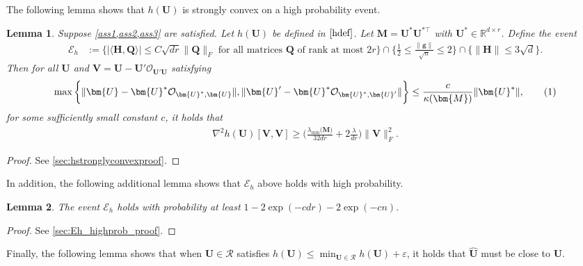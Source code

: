 \documentclass[10pt]{article}
\newcommand\numberthis{\addtocounter{equation}{1}\tag{\theequation}}
\newcommand{\eps}{\ensuremath{\varepsilon}}
\newcommand{\s}{^*}
\renewcommand{\hat}{\widehat}
\newtheorem{lemma}{Lemma}
\theoremstyle{definition}
\begin{document}
The following lemma shows that $h(\bm{U})$ is strongly convex on a high probability event.  
\begin{lemma} \label{lem:hstronglyconvex} Suppose \cref{ass1,ass2,ass3} are satisfied.
    Let $h(\bm{U})$ be defined in $\eqref{hdef}$.  Let $\bm{M} = \bm{U}\s \bm{U}^{*\top}$ with $\bm{U}\s \in \mathbb{R}^{d \times r}$.  Define the event
    \begin{align}
       \mathcal{E}_h &:= \bigg\{ \big| \langle \bm{H}, \bm{Q} \rangle \big| \leq C \sqrt{dr} \| \bm{Q} \|_F \text{ for all matrices $\bm{Q}$ of rank at most $2r$} \bigg\} \cap \big\{ \frac{1}{2} \leq  \frac{\|\bm{g}\|}{\sqrt{n}} \leq 2 \big\} \cap \bigg\{ \| \bm{H} \| \leq 3 \sqrt{d} \bigg\}.
    \end{align}
    Then for all $\bm{U}$ and $\bm{V} = \bm{U} - \bm{U}' \mathcal{O}_{\bm{U}'\bm{U}}$ satisfying
    \begin{align}
        \max\bigg\{ \| \bm{U} - \bm{U}\s \mathcal{O}_{\bm{U}\s,\bm{U}} \|, \| \bm{U}' - \bm{U}\s \mathcal{O}_{\bm{U}\s,\bm{U}'} \| \bigg\} \leq \frac{c}{\kappa(\bm{M})} \| \bm{U}\s \|, \numberthis \label{region}
    \end{align}
    for some sufficiently small constant $c$, 
    it holds that
    \begin{align}
        \nabla^2 h(\bm{U})[ \bm{V}, \bm{V}] \geq  \bigg(  \frac{ \lambda_{\min}\big( \bm{M} \big)}{32 dr}  + 2 \frac{\lambda}{dr}\bigg) \|\bm{V}\|_F^2.
    \end{align}
\end{lemma}
\begin{proof}
    See \cref{sec:hstronglyconvexproof}.  
\end{proof}
In addition, the following additional lemma shows that $\mathcal{E}_h$ above holds with high probability.
\begin{lemma} \label{lem:Eh_highprob}
    The event $\mathcal{E}_h$ holds with probability at least $1 - 2 \exp( - c dr) - 2 \exp( - c n)$.
\end{lemma}
\begin{proof}
    See \cref{sec:Eh_highprob_proof}. 
\end{proof}
\noindent 
Finally, the following lemma shows that when $\bm{U} \in \mathcal{R}$ satisfies $h(\bm{U}) \leq \min_{\bm{U} \in \mathcal{R}} h(\bm{U}) + \eps$, it holds that $\bm{\hat U}$ must be close to $\bm{U}$.  
\end{document}
